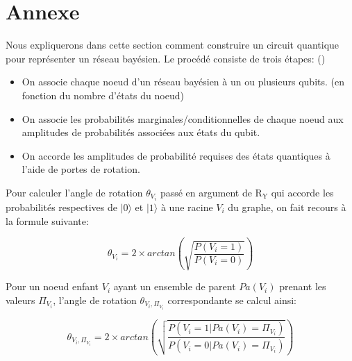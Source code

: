 \section{Annexe}
\label{annexe}

Nous expliquerons dans cette section comment construire un circuit quantique pour représenter un réseau bayésien. Le procédé consiste de trois étapes: (\cite{quant_rep_BN})
\begin{itemize}
    \item On associe chaque noeud d'un réseau bayésien à un ou plusieurs qubits. (en fonction du nombre d'états du noeud)
    \item On associe les probabilités marginales/conditionnelles de chaque noeud aux amplitudes de probabilités associées aux états du qubit. 
    \item On accorde les amplitudes de probabilité requises des états quantiques à l'aide de portes de rotation. 
\end{itemize}


\noindent Pour calculer l'angle de rotation \(\theta_{V_i}\) passé en argument de \(\mathrm{R_Y}\) qui accorde les probabilités respectives de \(|0\rangle\) et \(|1\rangle\) à une racine \(V_i\) du graphe, on fait recours à la formule suivante:

\begin{equation}
    \theta_{V_i} = 2 \times arctan(\sqrt{\frac{P(V_i=1)}{P(V_i=0)}})
\end{equation}

\noindent Pour un noeud enfant \(V_i\) ayant un ensemble de parent \(Pa(V_i)\) prenant les valeurs \(\Pi_{V_i}\), l'angle de rotation \(\theta_{V_i, \Pi_{V_i}}\) correspondante se calcul ainsi:

\begin{equation}
    \theta_{V_i, \Pi_{V_i}} = 2 \times arctan(\sqrt{\frac{P(V_i=1|Pa(V_i)=\Pi_{V_i})}{P(V_i=0|Pa(V_i)=\Pi_{V_i})}})
\end{equation}

